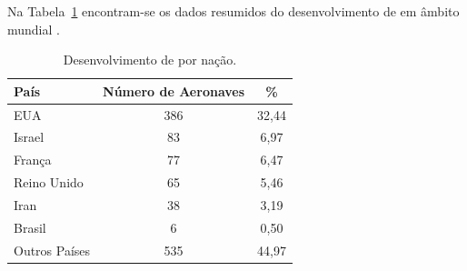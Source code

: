 Na Tabela~\ref{tbl:country} encontram-se os dados resumidos do desenvolvimento de \vants em âmbito mundial \cite{Bryner2007}.

\begin{table}[h!]
\centering
	\begin{tabular}{| l | c | c |}
		\hline
		País & Número de Aeronaves & \% \\
		\hline
		EUA & 386 & 32,44 \\
		Israel & 83 & 6,97 \\
		França & 77 & 6,47 \\
		Reino Unido & 65 & 5,46 \\
		Iran & 38 & 3,19 \\
		Brasil & 6 & 0,50\\
		Outros Países & 535 & 44,97 \\
		\hline
	\end{tabular}

	\caption{Desenvolvimento de \vants por nação.}
	\label{tbl:country}
\end{table}